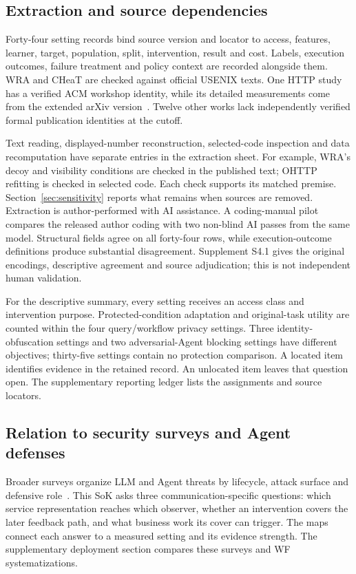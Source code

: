 \subsection{Extraction and source dependencies}
Forty-four setting records bind source version and locator to access, features, learner, target, population, split, intervention, result and cost. Labels, execution outcomes, failure treatment and policy context are recorded alongside them. WRA and CHeaT are checked against official USENIX texts. One HTTP study has a verified ACM workshop identity, while its detailed measurements come from the extended arXiv version~\cite{borysenko2026http,borysenko2026short}. Twelve other works lack independently verified formal publication identities at the cutoff.

Text reading, displayed-number reconstruction, selected-code inspection and data recomputation have separate entries in the extraction sheet. For example, WRA's decoy and visibility conditions are checked in the published text; OHTTP refitting is checked in selected code. Each check supports its matched premise. Section~\ref{sec:sensitivity} reports what remains when sources are removed. Extraction is author-performed with AI assistance. A coding-manual pilot compares the released author coding with two non-blind AI passes from the same model. Structural fields agree on all forty-four rows, while execution-outcome definitions produce substantial disagreement. Supplement S4.1 gives the original encodings, descriptive agreement and source adjudication; this is not independent human validation.

For the descriptive summary, every setting receives an access class and intervention purpose. Protected-condition adaptation and original-task utility are counted within the four query/workflow privacy settings. Three identity-obfuscation settings and two adversarial-Agent blocking settings have different objectives; thirty-five settings contain no protection comparison. A located item identifies evidence in the retained record. An unlocated item leaves that question open. The supplementary reporting ledger lists the assignments and source locators.

\subsection{Relation to security surveys and Agent defenses}
Broader surveys organize LLM and Agent threats by lifecycle, attack surface and defensive role~\cite{yao2024survey,shahriar2025survey,ferrag2025survey}. This SoK asks three communication-specific questions: which service representation reaches which observer, whether an intervention covers the later feedback path, and what business work its cover can trigger. The maps connect each answer to a measured setting and its evidence strength. The supplementary deployment section compares these surveys and WF systematizations.

